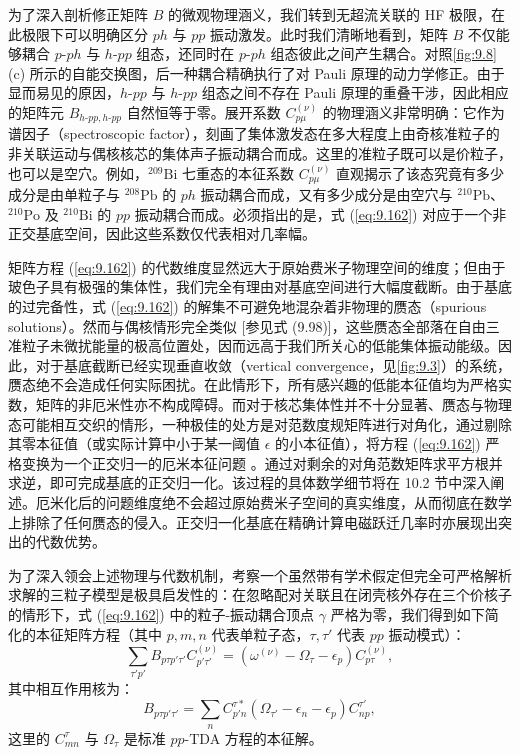 为了深入剖析修正矩阵 $B$ 的微观物理涵义，我们转到无超流关联的 HF 极限，在此极限下可以明确区分 $ph$ 与 $pp$
振动激发。此时我们清晰地看到，矩阵 $B$ 不仅能够耦合 $p\text{-}ph$ 与 $h\text{-}pp$ 组态，还同时在
$p\text{-}ph$ 组态彼此之间产生耦合。对照\ref{fig:9.8}(c) 所示的自能交换图，后一种耦合精确执行了对
Pauli 原理的动力学修正。由于显而易见的原因，$h\text{-}pp$ 与 $h\text{-}pp$ 组态之间不存在 Pauli
原理的重叠干涉，因此相应的矩阵元 $B_{h\text{-}pp,h\text{-}pp}$ 自然恒等于零。展开系数 $C^{(\nu)}_{p\mu}$
的物理涵义非常明确：它作为谱因子（spectroscopic factor），刻画了集体激发态在多大程度上由奇核准粒子的非关联运动与偶核核芯的集体声子振动耦合而成。这里的准粒子既可以是价粒子，也可以是空穴。例如，$^{209}\text{Bi}$
七重态的本征系数 $C^{(\nu)}_{p\mu}$ 直观揭示了该态究竟有多少成分是由单粒子与 $^{208}\text{Pb}$
的 $ph$ 振动耦合而成，又有多少成分是由空穴与 $^{210}\text{Pb}$、$^{210}\text{Po}$ 及
$^{210}\text{Bi}$ 的 $pp$ 振动耦合而成。必须指出的是，式 (\ref{eq:9.162}) 对应于一个非正交基底空间，因此这些系数仅代表相对几率幅。

矩阵方程 (\ref{eq:9.162}) 的代数维度显然远大于原始费米子物理空间的维度；但由于玻色子具有极强的集体性，我们完全有理由对基底空间进行大幅度截断。由于基底的过完备性，式
(\ref{eq:9.162}) 的解集不可避免地混杂着非物理的赝态（spurious solutions）。然而与偶核情形完全类似
{[}参见式 (9.98){]}，这些赝态全部落在自由三准粒子未微扰能量的极高位置处，因而远高于我们所关心的低能集体振动能级。因此，对于基底截断已经实现垂直收敛（vertical
convergence，见\ref{fig:9.3}）的系统，赝态绝不会造成任何实际困扰。在此情形下，所有感兴趣的低能本征值均为严格实数，矩阵的非厄米性亦不构成障碍。而对于核芯集体性并不十分显著、赝态与物理态可能相互交织的情形，一种极佳的处方是对范数度规矩阵进行对角化，通过剔除其零本征值（或实际计算中小于某一阈值
$\epsilon$ 的小本征值），将方程 (\ref{eq:9.162}) 严格变换为一个正交归一的厄米本征问题 \cite{IRS80,BSL79}。通过对剩余的对角范数矩阵求平方根并求逆，即可完成基底的正交归一化。该过程的具体数学细节将在
10.2 节中深入阐述。厄米化后的问题维度绝不会超过原始费米子空间的真实维度，从而彻底在数学上排除了任何赝态的侵入。正交归一化基底在精确计算电磁跃迁几率时亦展现出突出的代数优势。

为了深入领会上述物理与代数机制，考察一个虽然带有学术假定但完全可严格解析求解的三粒子模型是极具启发性的：在忽略配对关联且在闭壳核外存在三个价核子的情形下，式
(\ref{eq:9.162}) 中的粒子-振动耦合顶点 $\gamma$ 严格为零，我们得到如下简化的本征矩阵方程（其中 $p,m,n$
代表单粒子态，$\tau,\tau'$ 代表 $pp$ 振动模式）：
\begin{equation}
\sum_{\tau'p'}B_{p\tau p'\tau'}C^{(\nu)}_{p'\tau'}=\left(\omega^{(\nu)}-\Omega_{\tau}-\epsilon_{p}\right)C^{(\nu)}_{p\tau},\label{eq:9.164}
\end{equation}
其中相互作用核为：
\begin{equation}
B_{p\tau p'\tau'}=\sum_{n}C^{\tau*}_{p'n}(\Omega_{\tau'}-\epsilon_{n}-\epsilon_{p})C^{\tau'}_{np},\label{eq:9.165}
\end{equation}
这里的 $C^{\tau}_{mn}$ 与 $\Omega_{\tau}$ 是标准 $pp$-TDA 方程的本征解。

